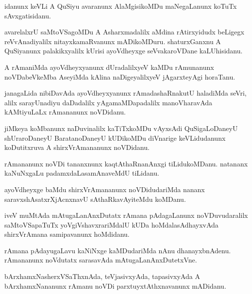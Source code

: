 \documentclass{article}
\begin{document}
\begin{mn}%
idanunx keVLi A QuSiyu avaranunx AlaMgisikoMDu maNegaLanunx koTuTx sAvxgatisidanu.
\end{mn}

\begin{mn}%
avarelalxrU saMtoVSagoMDu A Asharxmadalilx aMdina rAtirxyidudx beLigegx reVvAnadiyalilx 
nitayxkamaRvanunx mADikoMDuru. shaturxGanxnu A QuSiyanunx palakikxyalilx kUrisi ayoVdheyxge 
seVvakaroVDane kaLUhisidanu.
\end{mn}

\begin{mn}%
A rAmaniMda ayoVdheyxyanunx dUradalilxyeV kaMDu rAmunanunx noVDabeVkeMba AseyiMda kAlina 
naDigeyalilxyeV jAgarxteyAgi horaTanu.
\end{mn}

\begin{mn}%
janagaLida nibiDavAda ayoVdheyxyanunx rAmadashaRnakutU haladiMda seVri, alilx sarayUnadiyu 
daDadalilx yAgamaMDapadalilx manoVharavAda kAMtiyuLaLx rAmananunx noVDidanu.
\end{mn}

\begin{mn}%
jiMkeya koMbanunx naDuvinalilx kaTiTxkoMDu vAyxsAdi QuSigaLoDaneyU shUraroDaneyU 
BaratanoDaneyU kUDikoMDu diVnarige keVLidudanunx koDutitxruva A shirxVrAmananunx noVDidanu.
\end{mn}

\begin{mn}%
rAmananunx noVDi tananxnunx kaqtAthaRnanAnxgi tiLidukoMDanu. natananx kaNuNxgaLu 
padamxdaLasamAnaveMdU tiLidanu.
\end{mn}

\begin{mn}%
ayoVdheyxge baMdu shirxVrAmananunx noVDidudariMda nananx saravxshAsatxrXjAcnxnavU 
sAthaRkavAyiteMdu koMDanu.
\end{mn}

\begin{mn}%
iveV muMtAda mAtugaLanAnxDutatx rAmana pAdagaLanunx noVDuvudaralilx saMtoVSapaTuTx 
yoVgiVshavxrariMdalU kUDa hoMdalasAdhayxvAda shirxVrAmana samipavanunx hoMdidanu.
\end{mn}

\begin{mn}%
rAmana pAdayugaLavu kaNiNxge kaMDudariMda nAnu dhanayxbnAdenu. rAmananunx noVdutatx 
sarasavAda mAtugaLanAnxDutetxVne.
\end{mn}

\begin{mn}%
bArxhamxNasherxVSaThxnAda, teVjasivxyAda, tapasivxyAda A bArxhamxNananunx rAmanu noVDi 
parxtuyxtAthxnavanunx mADidanu.
\end{mn}
\end{document}
